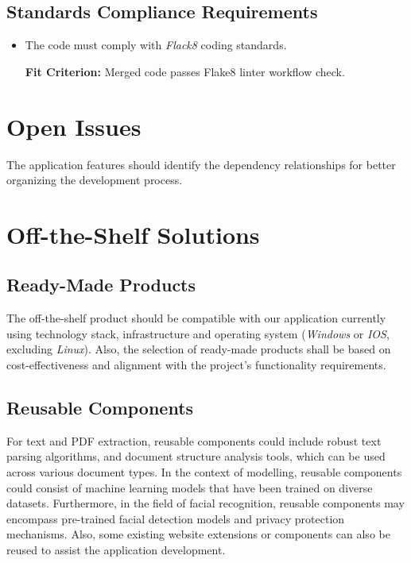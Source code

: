 \documentclass[12pt]{article}
\newcounter{crnum} %
\newcommand{\rthecrnum}{CR\refstepcounter{crnum}\thecrnum:}
\begin{document}
\subsection{Standards Compliance Requirements}
\begin{itemize}[leftmargin=16.5mm,labelsep=4mm,label=\rthecrnum]
\item
The code must comply with \textit{Flack8} coding standards.

\textbf{Fit Criterion:} Merged code passes Flake8 linter workflow check.
\end{itemize}

\section{Open Issues}
 The application features should identify the dependency relationships for better organizing the development process.\\


\section{Off-the-Shelf Solutions}
\subsection{Ready-Made Products}

    The off-the-shelf product should be compatible with our application currently using technology stack, infrastructure and operating system (\textit{Windows} or \textit{IOS}, excluding \textit{Linux}).
    Also, the selection of ready-made products shall be based on cost-effectiveness and alignment with the project's functionality requirements.
    
\subsection{Reusable Components}
For text and PDF extraction, reusable components could include robust text parsing algorithms, and document structure analysis tools, which can be used across various document types. In the context of modelling, reusable components could consist of machine learning models that have been trained on diverse datasets. Furthermore, in the field of facial recognition, reusable components may encompass pre-trained facial detection models and privacy protection mechanisms. Also, some existing website extensions or components can also be reused to assist the application development. \\
\end{document}
